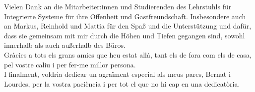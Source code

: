 \documentclass{listhesis}
\begin{document}
Vielen Dank an die Mitarbeiter:innen und Studierenden des Lehrstuhls für Integrierte Systeme für ihre Offenheit und Gastfreundschaft.
Insbesondere auch an Markus, Reinhold und Mattia für den Spaß und die Unterstützung und dafür, dass sie gemeinsam mit mir durch die 
Höhen und Tiefen gegangen sind, sowohl innerhalb als auch außerhalb des Büros. \\

Gràcies a tots els grans amics que heu estat allà, tant els de fora com els de casa, pel vostre caliu i per fer-me millor persona. \\

I finalment, voldria dedicar un agraïment especial als meus pares, Bernat i Lourdes, per la vostra paciència i per tot el que no hi cap en una dedicatòria.

\clearpage




\tableofcontents
\clearpage
\printglossary[type=\acronymtype,title={List of Acronyms}]
\clearpage
\listoffigures
\clearpage
\listoftables
\clearpage










%


\cleardoublepage



\confirmation
\end{document}
